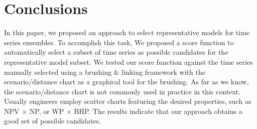 \documentclass[final,5p,times,twocolumn]{elsarticle}
\begin{document}





\section{Conclusions}
\label{sec:conclusion}

In this paper, we proposed an approach to select representative models for time series ensembles. To accomplish this task, We  proposed a score function to automatically select a subset of time series as possible candidates for the representative model subset. We tested our score function against the time series manually selected using a brushing \& linking framework with the scenario/distance chart as a graphical tool for the brushing. As far as we know, the scenario/distance chart is not commonly used in practice in this context. Usually engineers employ scatter charts featuring the desired properties, such as NPV $\times$ NP, or WP $\times$ BHP. The results indicate that our approach obtains a good set of possible candidates.
\end{document}
